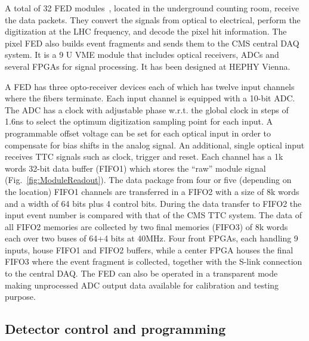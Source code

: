 A total of 32 FED modules~\cite{Pernicka:1091743}, located in the underground counting room, receive the data packets.
They convert the signals from optical to electrical, perform the digitization at the LHC frequency, and decode the pixel hit information.
The pixel FED also builds event fragments and sends them to the CMS central DAQ system.
It is a 9 U VME module that includes optical receivers, ADCs and several FPGAs for signal processing.
It has been designed at HEPHY Vienna.

A FED has three opto-receiver devices each of which has twelve input channels where the fibers terminate. Each input channel is equipped with a 10-bit ADC.
The ADC has a clock with adjustable phase w.r.t. the global clock in steps of 1.6\unit{ns} to select the optimum digitization sampling point for each input.
A programmable offset voltage can be set for each optical input in order to compensate for bias shifts in the analog signal.
An additional, single optical input receives TTC signals such as clock, trigger and reset.
Each channel has a 1k words 32-bit data buffer (FIFO1) which stores the ``raw'' module signal (Fig.~\ref{fig:ModuleReadout}).
The data package from four or five (depending on the location) FIFO1 channels are transferred in a FIFO2 with a size of 8k words and a width of 64 bits plus 4 control bits.
During the data transfer to FIFO2 the input event number is compared with that of the CMS TTC system.
The data of all FIFO2 memories are collected by two final memories (FIFO3) of 8k words each over two buses of 64+4 bits at 40\unit{MHz}. 
Four front FPGAs, each handling 9 inputs, house FIFO1 and FIFO2 buffers, while a center FPGA houses the final FIFO3 where the event fragment is collected,
together with the S-link connection to the central DAQ.
The FED can also be operated in a transparent mode making unprocessed ADC output data available for calibration and testing purpose. 

\subsection{Detector control and programming}

